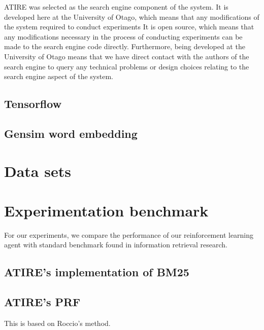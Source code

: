 ATIRE was selected as the search engine component of the system. It is developed here at the University of Otago, which means that any modifications of the system required to conduct experiments 
It is open source, which means that any modifications necessary in the process of conducting experiments can be made to the search engine code directly. Furthermore, being developed at the University of Otago means that we have direct contact with the authors of the search engine to query any technical problems or design choices relating to the search engine aspect of the system.



\subsection{Tensorflow}

\subsection{Gensim word embedding}




\section{Data sets}






\section{Experimentation benchmark}

For our experiments, we compare the performance of our reinforcement learning agent with standard benchmark found in information retrieval research. 

\subsection{ATIRE's implementation of BM25}

\subsection{ATIRE's PRF}

This is based on Roccio's method. 


















